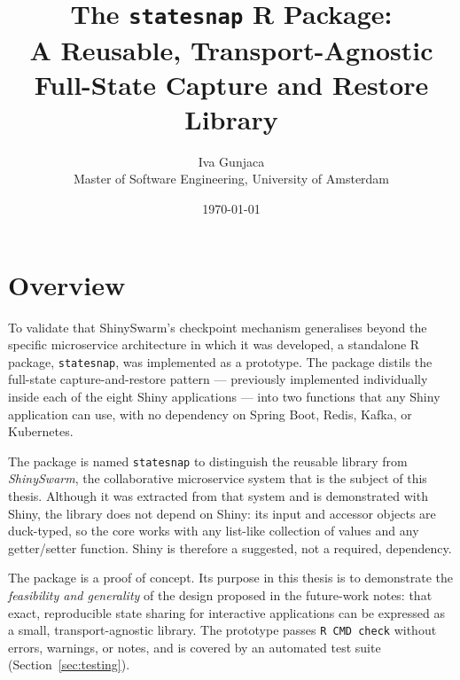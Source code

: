 \documentclass[11pt,a4paper]{article}
\title{The \texttt{statesnap} R Package:\\
  A Reusable, Transport-Agnostic Full-State Capture and Restore Library}
\author{Iva Gunjaca\\Master of Software Engineering, University of Amsterdam}
\date{\today}
\begin{document}
\maketitle

\begin{center}
\end{center}

\vspace{1em}

\section{Overview}

To validate that ShinySwarm's checkpoint mechanism generalises beyond the
specific microservice architecture in which it was developed, a standalone R
package, \texttt{statesnap}, was implemented as a prototype. The package
distils the full-state capture-and-restore pattern --- previously implemented
individually inside each of the eight Shiny applications --- into two functions
that any Shiny application can use, with no dependency on Spring Boot, Redis,
Kafka, or Kubernetes.

The package is named \texttt{statesnap} to distinguish the reusable library from
\emph{ShinySwarm}, the collaborative microservice system that is the subject of
this thesis. Although it was extracted from that system and is demonstrated with
Shiny, the library does not depend on Shiny: its input and accessor objects are
duck-typed, so the core works with any list-like collection of values and any
getter/setter function. Shiny is therefore a suggested, not a required,
dependency.

The package is a proof of concept. Its purpose in this thesis is to demonstrate
the \emph{feasibility and generality} of the design proposed in the future-work
notes: that exact, reproducible state sharing for interactive applications
can be expressed as a small, transport-agnostic library. The prototype passes
\texttt{R~CMD~check} without errors, warnings, or notes, and is covered by an
automated test suite (Section~\ref{sec:testing}).

\end{document}
